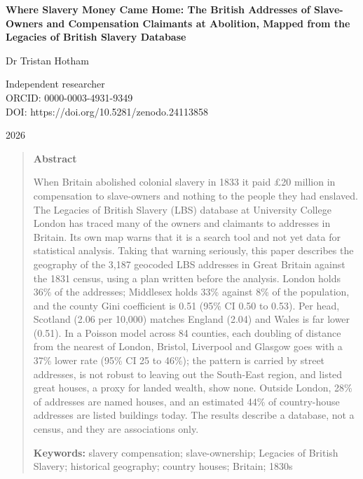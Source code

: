 \documentclass[11pt,a4paper]{article}
\begin{document}
\begin{center}
{\Large\bfseries Where Slavery Money Came Home: The British Addresses of Slave-Owners and Compensation Claimants at Abolition, Mapped from the Legacies of British Slavery Database\par}
\vspace{1.2em}
{\large Dr Tristan Hotham\par}
\vspace{0.3em}
{\small Independent researcher\\
ORCID: 0000-0003-4931-9349\\
DOI: https://doi.org/10.5281/zenodo.24113858\par}
\vspace{0.8em}
2026
\end{center}

\begin{quote}
\small
\begin{center}\textbf{Abstract}\end{center}
When Britain abolished colonial slavery in 1833 it paid \pounds 20 million in compensation to slave-owners and nothing to the people they had enslaved. The Legacies of British Slavery (LBS) database at University College London has traced many of the owners and claimants to addresses in Britain. Its own map warns that it is a search tool and not yet data for statistical analysis. Taking that warning seriously, this paper describes the geography of the 3,187 geocoded LBS addresses in Great Britain against the 1831 census, using a plan written before the analysis. London holds 36\% of the addresses; Middlesex holds 33\% against 8\% of the population, and the county Gini coefficient is 0.51 (95\% CI 0.50 to 0.53). Per head, Scotland (2.06 per 10,000) matches England (2.04) and Wales is far lower (0.51). In a Poisson model across 84 counties, each doubling of distance from the nearest of London, Bristol, Liverpool and Glasgow goes with a 37\% lower rate (95\% CI 25 to 46\%); the pattern is carried by street addresses, is not robust to leaving out the South-East region, and listed great houses, a proxy for landed wealth, show none. Outside London, 28\% of addresses are named houses, and an estimated 44\% of country-house addresses are listed buildings today. The results describe a database, not a census, and they are associations only.

\textbf{Keywords:} slavery compensation; slave-ownership; Legacies of British Slavery; historical geography; country houses; Britain; 1830s
\end{quote}
\end{document}
